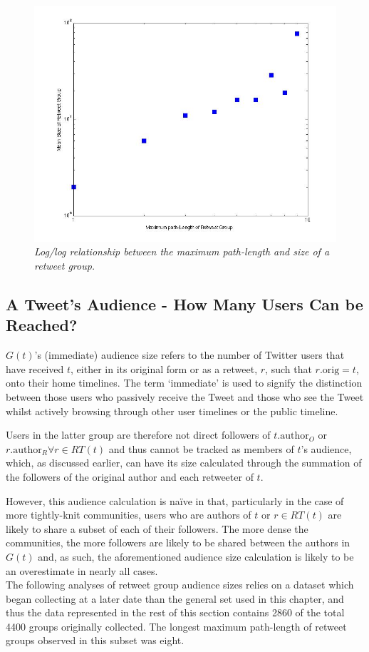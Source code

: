 \begin{figure}[h]
\centering
\includegraphics[scale=0.5]{3.Chapter1/Media/retweets-pathlength.jpg} 
\caption{\textit{Log/log relationship between the maximum path-length and size of a retweet group.}}
\label{fig:totalretweets-pathlength}
\end{figure}


\subsection{A Tweet's Audience - How Many Users Can be Reached?}
$G(t)$'s (immediate) audience size refers to the number of Twitter users that have received $t$, either in its original form or as a retweet, $r$, such that $r.\textrm{orig} = t$, onto their home timelines. The term `immediate' is used to signify the distinction between those users who passively receive the Tweet and those who see the Tweet whilst actively browsing through other user timelines or the public timeline.

Users in the latter group are therefore not direct followers of $t.\textrm{author}_O$ or $r.\textrm{author}_R \forall r \in RT(t)$ and thus cannot be tracked as members of $t$'s audience, which, as discussed earlier, can have its size calculated through the summation of the followers of the original author and each retweeter of $t$.

However, this audience calculation is naïve in that, particularly in the case of more tightly-knit communities, users who are authors of $t$ or $r \in RT(t)$ are likely to share a subset of each of their followers. The more dense the communities, the more followers are likely to be shared between the authors in $G(t)$ and, as such, the aforementioned audience size calculation is likely to be an overestimate in nearly all cases.\\
The following analyses of retweet group audience sizes relies on a dataset which began collecting at a later date than the general set used in this chapter, and thus the data represented in the rest of this section contains 2860 of the total 4400 groups originally collected. The longest maximum path-length of retweet groups observed in this subset was eight.

